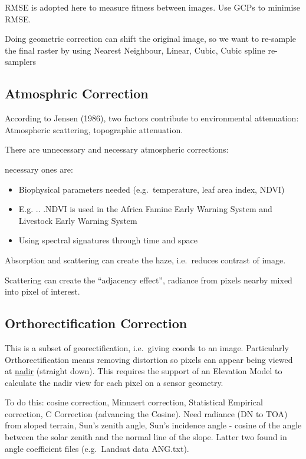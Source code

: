 \documentclass[
  letterpaper,
  DIV=11,
  numbers=noendperiod]{scrreprt}
\begin{document}
RMSE is adopted here to measure fitness between images. Use GCPs to
minimise RMSE.

Doing geometric correction can shift the original image, so we want to
re-sample the final raster by using Nearest Neighbour, Linear, Cubic,
Cubic spline re-samplers

\hypertarget{atmosphric-correction}{%
\subsection{Atmosphric Correction}\label{atmosphric-correction}}

According to Jensen (1986), two factors contribute to environmental
attenuation: Atmospheric scattering, topographic attenuation.

There are unnecessary and necessary atmospheric corrections:

necessary ones are:

\begin{itemize}
\item
  Biophysical parameters needed (e.g.~temperature, leaf area index,
  NDVI)
\item
  E.g. .. .NDVI is used in the Africa Famine Early Warning System and
  Livestock Early Warning System
\item
  Using spectral signatures through time and space
\end{itemize}

Absorption and scattering can create the haze, i.e.~reduces contrast of
image.

Scattering can create the ``adjacency effect'', radiance from pixels
nearby mixed into pixel of interest.

\hypertarget{orthorectification-correction}{%
\subsection{Orthorectification
Correction}\label{orthorectification-correction}}

This is a subset of georectification, i.e.~giving coords to an image.
Particularly Orthorectification means removing distortion so pixels can
appear being viewed at \uline{nadir} (straight down). This requires the
support of an Elevation Model to calculate the nadir view for each pixel
on a sensor geometry.

To do this: cosine correction, Minnaert correction, Statistical
Empirical correction, C Correction (advancing the Cosine). Need radiance
(DN to TOA) from sloped terrain, Sun's zenith angle, Sun's incidence
angle - cosine of the angle between the solar zenith and the normal line
of the slope. Latter two found in angle coefficient files (e.g.~Landsat
data ANG.txt).
\end{document}
